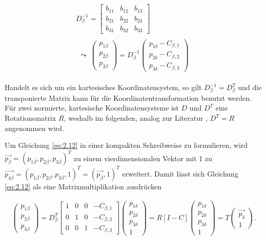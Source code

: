 \begin{gather}
	D_\beta^{-1} = 
	\begin{bmatrix}b_{11} & b_{12} & b_{13}\\
		b_{21} & b_{22} & b_{23}\\
		b_{31} & b_{32} & b_{33}
	\end{bmatrix}\\
	\begin{split}
		\leadsto \: \begin{pmatrix}
			p_{1\beta}\\p_{2\beta}\\ p_{3\beta}
		\end{pmatrix}
		= D_\beta^{-1} 
		\begin{pmatrix}
			p_{1\delta} - C_{\beta,1}\\
			p_{2\delta} - C_{\beta,2}\\
			p_{3\delta} - C_{\beta,3}
		\end{pmatrix}\label{eq:2.12}
	\end{split} 
\end{gather}

Handelt es sich um ein kartesisches Koordinatensystem, so gilt $\ensuremath{D_\beta^{-1}}=D_\beta^{T}$ und die transponierte Matrix kann für die Koordinatentransformation benutzt werden. Für zwei normierte, kartesische Koordinatensysteme ist $D$ und $D^T$ eine Rotationsmatrix $R$, weshalb im folgenden, analog zur Literatur \cite{HZ,Elements,Ferid}, $D^T=R$ angenommen wird.  

Um Gleichung \ref{eq:2.12} in einer kompakten Schreibweise zu formulieren, wird $\vec{p_{\beta}}=(p_{1\beta},p_{2\beta},p_{3\beta})^T$ zu einem vierdimensionalen Vektor mit 1 zu
$\vec{p_{4\beta}}=(p_{1\beta},p_{2\beta},p_{3\beta},1)^T=(\vec{p_{\beta}},1)^T$ erweitert. Damit lässt sich Gleichung \ref{eq:2.12} als eine Matrixmultiplikation ausdrücken

\begin{gather}
	\begin{pmatrix}
		p_{1\beta}\\p_{2\beta}\\ p_{3\beta}
	\end{pmatrix}
	= D_\beta^T	
	\begin{bmatrix}1 & 0 & 0 & - C_{\beta,1}\\
		0 & 1 & 0& - C_{\beta,2}\\
		0 & 0 & 1 & - C_{\beta,3}
	\end{bmatrix} 
	\begin{pmatrix}
		p_{1\delta}\\p_{2\delta}\\ p_{3\delta}\\1
	\end{pmatrix}
	= R	[I -C] 	 \begin{pmatrix}
		p_{1\delta}\\p_{2\delta}\\ p_{3\delta}\\1
	\end{pmatrix}
	= T	\begin{pmatrix}
		\vec{p_\delta}\\1
	\end{pmatrix}.	 \label{eq:trafo}
\end{gather}

